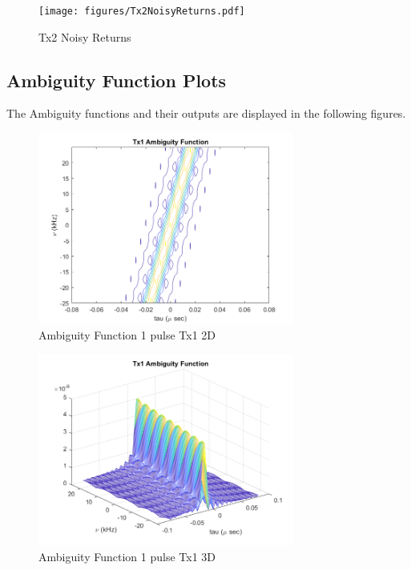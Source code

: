 \documentclass{article}
\begin{document}
\begin{figure}[H]
    \centering
    \texttt{[image: figures/Tx2NoisyReturns.pdf]}
    \caption{{Tx2} Noisy Returns}
    \label{fig:Tx2NR}
\end{figure}

\subsection{Ambiguity Function Plots}
The Ambiguity functions and their outputs are displayed in the following figures.
\begin{figure}[H]
    \centering
    \includegraphics[width=0.75\textwidth]{figures/ambiguityFunction_1pulse_Tx1_2D.png}
    \caption{Ambiguity Function 1 pulse Tx1 2D}
    \label{fig:AF1_Tx1_2D}
\end{figure}

\begin{figure}[H]
    \centering
    \includegraphics[width=0.75\textwidth]{figures/ambiguityFunction_1pulse_Tx1_3D.png}
    \caption{Ambiguity Function 1 pulse Tx1 3D}
    \label{fig:AF1_Tx1_3D}
\end{figure}
\end{document}
